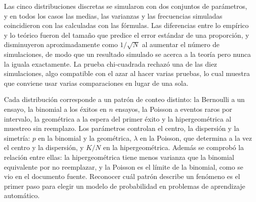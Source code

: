 \documentclass[11pt,letterpaper]{article}
\begin{document}
Las cinco distribuciones discretas se simularon con dos conjuntos de parámetros, y en todos los casos las medias, las varianzas y las frecuencias simuladas coincidieron con las calculadas con las fórmulas. Las diferencias entre lo empírico y lo teórico fueron del tamaño que predice el error estándar de una proporción, y disminuyeron aproximadamente como $1/\sqrt{N}$ al aumentar el número de simulaciones, de modo que un resultado simulado se acerca a la teoría pero nunca la iguala exactamente. La prueba chi-cuadrada rechazó una de las diez simulaciones, algo compatible con el azar al hacer varias pruebas, lo cual muestra que conviene usar varias comparaciones en lugar de una sola.

Cada distribución corresponde a un patrón de conteo distinto: la Bernoulli a un ensayo, la binomial a los éxitos en $n$ ensayos, la Poisson a eventos raros por intervalo, la geométrica a la espera del primer éxito y la hipergeométrica al muestreo sin reemplazo. Los parámetros controlan el centro, la dispersión y la simetría: $p$ en la binomial y la geométrica, $\lambda$ en la Poisson, que determina a la vez el centro y la dispersión, y $K/N$ en la hipergeométrica. Además se comprobó la relación entre ellas: la hipergeométrica tiene menos varianza que la binomial equivalente por no reemplazar, y la Poisson es el límite de la binomial, como se vio en el documento fuente. Reconocer cuál patrón describe un fenómeno es el primer paso para elegir un modelo de probabilidad en problemas de aprendizaje automático.

\end{document}
